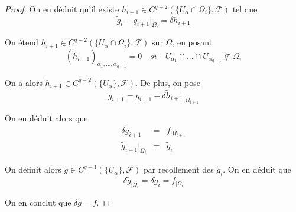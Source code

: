 \documentclass{article}
\theoremstyle{definition}
\theoremstyle{remark}
\begin{document}
\begin{proof}
On en déduit qu'il existe $h_{i+1} \in C^{q-2}(\{U_\alpha\cap \Omega_i\}, \mathcal{F})$ tel que
$$\tilde{g}_i - g_{i+1}{|_{\Omega_{i}}} = \delta h_{i+1}$$

On étend $h_{i+1} \in C^{q-2}(\{U_\alpha\cap \Omega_i\}, \mathcal{F})$ sur $\Omega$, en posant
$$(\tilde{h}_{i+1})_{\alpha_1, ..., \alpha_{q-1}} = 0 \quad si \quad U_{\alpha_1}\cap ... \cap U_{\alpha_{q-1}} \not \subset \Omega_i$$

On a alors $\tilde{h}_{i+1} \in C^{q-2}(\{U_\alpha\}, \mathcal{F})$. De plus, on pose
$$\tilde{g}_{i+1} = g_{i+1} + \delta \tilde{h}_{i+1}|_{\Omega_{i+1}}$$

On en déduit alors que
\begin{eqnarray}
\nonumber \delta \tilde{g}_{i+1} &=& f_{|\Omega_{i+1}} \\
\nonumber \tilde{g}_{i+1}|_{\Omega_i} &=& \tilde{g}_i
\end{eqnarray}

On définit alors $\tilde{g} \in C^{q-1}(\{U_\alpha\}, \mathcal{F})$ par recollement des $\tilde{g}_i$. On en déduit que
$$\delta \tilde{g}_{|\Omega_i} = \delta \tilde{g}_i = f_{|\Omega_i}$$

On en conclut que $\delta \tilde{g} = f$.
\end{proof}



\end{document}
